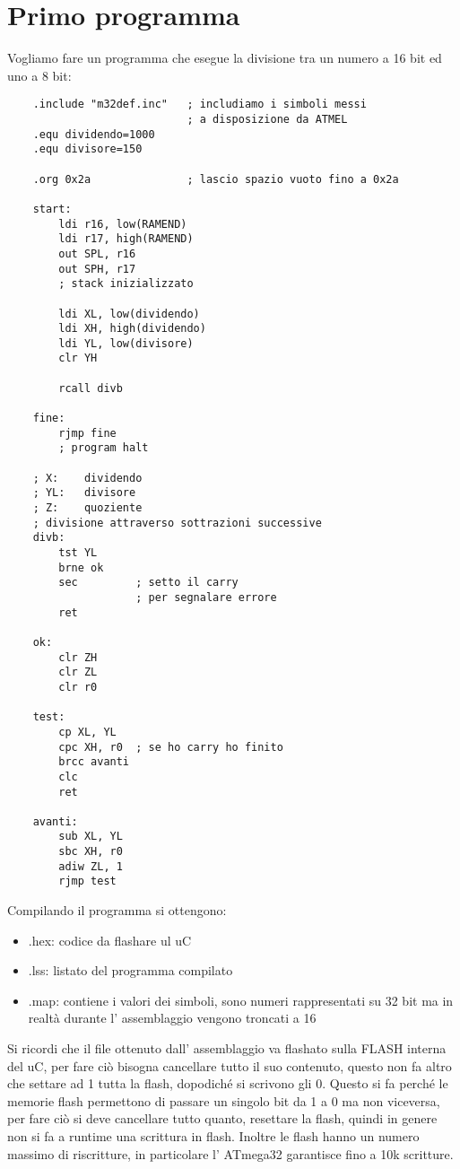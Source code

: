 \section{Primo programma}
Vogliamo fare un programma che esegue la divisione tra un numero a 16 bit ed uno a 8 bit:
\begin{verbatim}
    .include "m32def.inc"   ; includiamo i simboli messi
                            ; a disposizione da ATMEL
    .equ dividendo=1000
    .equ divisore=150

    .org 0x2a               ; lascio spazio vuoto fino a 0x2a
    
    start:
        ldi r16, low(RAMEND)
        ldi r17, high(RAMEND)
        out SPL, r16
        out SPH, r17
        ; stack inizializzato
        
        ldi XL, low(dividendo)
        ldi XH, high(dividendo)
        ldi YL, low(divisore)
        clr YH
        
        rcall divb
    
    fine:
        rjmp fine
        ; program halt
    
    ; X:    dividendo
    ; YL:   divisore
    ; Z:    quoziente
    ; divisione attraverso sottrazioni successive
    divb:
        tst YL
        brne ok
        sec         ; setto il carry
                    ; per segnalare errore
        ret
    
    ok:
        clr ZH
        clr ZL
        clr r0
    
    test:
        cp XL, YL
        cpc XH, r0  ; se ho carry ho finito
        brcc avanti
        clc
        ret
    
    avanti:
        sub XL, YL
        sbc XH, r0
        adiw ZL, 1
        rjmp test
\end{verbatim}
Compilando il programma si ottengono:
\begin{itemize}
    \item .hex: codice da flashare ul uC
    \item .lss: listato del programma compilato
    \item .map: contiene i valori dei simboli, sono numeri rappresentati su 32 bit ma in realtà durante l' assemblaggio vengono troncati a 16
\end{itemize}

Si ricordi che il file ottenuto dall' assemblaggio va flashato sulla FLASH interna del uC, per fare ciò bisogna cancellare tutto il suo contenuto, questo non fa altro che settare ad 1 tutta la flash, dopodiché si scrivono gli 0.
Questo si fa perché le memorie flash permettono di passare un singolo bit da 1 a 0 ma non viceversa, per fare ciò si deve cancellare tutto quanto, resettare la flash, quindi in genere non si fa a runtime una scrittura in flash.
Inoltre le flash hanno un numero massimo di riscritture, in particolare l' ATmega32 garantisce fino a 10k scritture.


